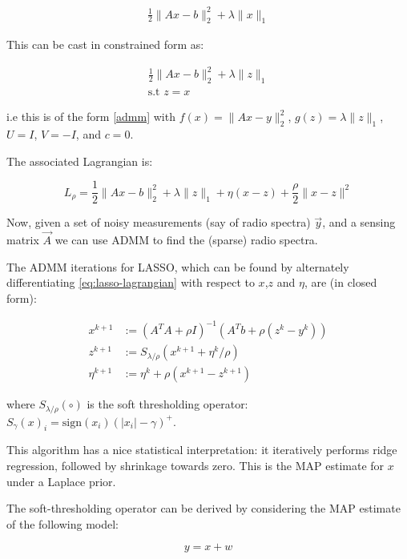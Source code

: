 \begin{eqnarray}
\frac{1}{2}\|Ax-b\|_2^2 + \lambda\|x\|_1
\end{eqnarray}

This can be cast in constrained form as:

\begin{eqnarray}
\frac{1}{2}\|Ax-b\|_2^2 + \lambda\|z\|_1 \\
\text{s.t } z = x
\end{eqnarray}

i.e this is of the form \eqref{admm} with \( f\left(x\right) =\|Ax-y\|_2^2\), \(g\left(z\right) = \lambda\|z\|_1\), \(U=I\), \(V=-I\), and \(c=0\).

The associated Lagrangian is:

\begin{equation}
L_\rho = \frac{1}{2}\|Ax-b\|_2^2 + \lambda\|z\|_1 + \eta\left(x-z\right) + \frac{\rho}{2}\|x-z\|^2
\label{eq:lasso-lagrangian}
\end{equation}

Now, given a set of noisy measurements (say of radio spectra) \(\vec{y}\), and a sensing matrix \(\vec{A}\) we can use ADMM to find the (sparse) radio spectra.

The ADMM iterations for LASSO, which can be found by alternately differentiating \eqref{eq:lasso-lagrangian} with respect to \(x\),\(z\) and \(\eta\), are (in closed form):

\begin{align}
x^{k+1} &:= \left(A^TA + \rho I\right)^{-1}\left(A^Tb +\rho\left(z^k - y^k\right)\right)\\
z^{k+1} &:= S_{\lambda/\rho}\left(x^{k+1} + \eta^k/\rho\right)
 \\
\eta^{k+1} &:= \eta^{k} + \rho \left(x^{k+1}-z^{k+1}\right)
\label{admm_algo_lasso}
\end{align}

where \(S_{\lambda/\rho}\left(\circ\right)\) is the soft thresholding operator: \(S_\gamma\left(x\right)_i = \mathrm{sign}(x_i)\left(|x_i| - \gamma\right)^+\).

This algorithm has a nice statistical interpretation: it iteratively performs ridge regression, followed by shrinkage towards zero. This is the MAP estimate for \(x\) under a Laplace prior.

The soft-thresholding operator can be derived by considering the MAP estimate of the following model:

\begin{equation}
y = x + w
\end{equation}

